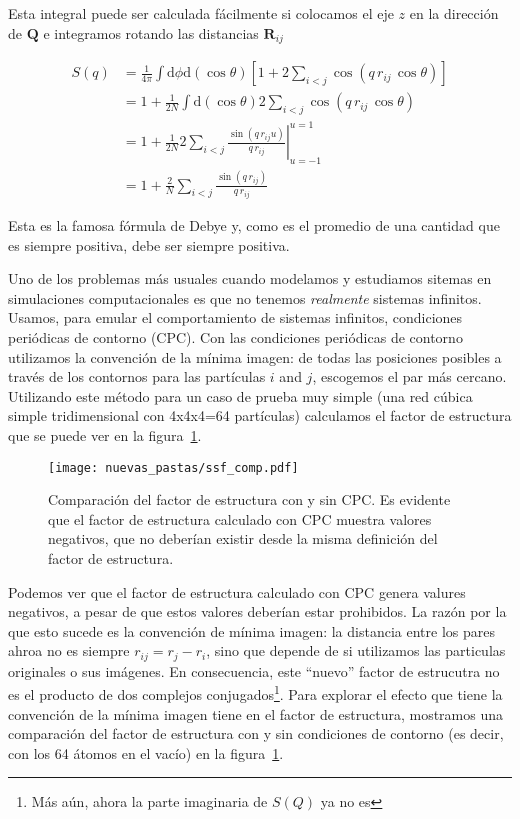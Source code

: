 Esta integral puede ser calculada fácilmente si colocamos el eje $z$ en la dirección de $\mathbf{Q}$ e integramos rotando las distancias $\mathbf{R}_{ij}$

\begin{align*}
  S(q) &= \frac{1}{4\pi}\int\text{d}\phi\text{d}(\cos\theta)
  \left[1 + 2\sum_{i < j}\cos\left(q\,r_{ij}\,\cos\theta\right)\right]\\
  &= 1 + \frac{1}{2N}\int\text{d}(\cos\theta)
  2\sum_{i < j}\cos\left(q\,r_{ij}\,\cos\theta\right)\\
  &= 1 + \frac{1}{2N} 2 \sum_{i < j} \left.\frac{\sin(q\,r_{ij}u)}{q\,r_{ij}}\right|_{u=-1}^{u=1}\\
  &= 1 + \frac{2}{N} \sum_{i < j}\frac{\sin(q\,r_{ij})}{q\,r_{ij}}
\end{align*}

Esta es la famosa fórmula de Debye y, como es el promedio de una cantidad que es siempre positiva, debe ser siempre positiva.

Uno de los problemas más usuales cuando modelamos y estudiamos sitemas en simulaciones computacionales es que no tenemos \emph{realmente} sistemas infinitos.
Usamos, para emular el comportamiento de sistemas infinitos, condiciones periódicas de contorno (CPC).
Con las condiciones periódicas de contorno utilizamos la convención de la mínima imagen: de todas las posiciones posibles a través de los contornos para las partículas $i$ and $j$, escogemos el par más cercano.
Utilizando este método para un caso de prueba muy simple (una red cúbica simple tridimensional con 4x4x4=64 partículas) calculamos el factor de estructura que se puede ver en la figura~\ref{fig:ssf_comp}.

\begin{figure}
  \centering
  \texttt{[image: nuevas\_pastas/ssf\_comp.pdf]}
  \caption{Comparación del factor de estructura con y sin CPC.
    Es evidente que el factor de estructura calculado con CPC muestra valores negativos, que no deberían existir desde la misma definición del factor de estructura.}
  \label{fig:ssf_comp}
\end{figure}

Podemos ver que el factor de estructura calculado con CPC genera valures negativos, a pesar de que estos valores deberían estar prohibidos.
La razón por la que esto sucede es la convención de mínima imagen: la distancia entre los pares ahroa no es siempre $r_{ij} = r_j - r_i$, sino que depende de si utilizamos las particulas originales o sus imágenes.
En consecuencia, este ``nuevo'' factor de estrucutra no es el producto de dos complejos conjugados\footnote{Más aún, ahora la parte imaginaria de $S(Q)$ ya no es}.
Para explorar el efecto que tiene la convención de la mínima imagen tiene en el factor de estructura, mostramos una comparación del factor de estructura con y sin condiciones de contorno (es decir, con los 64 átomos en el vacío) en la figura~\ref{fig:ssf_comp}.

